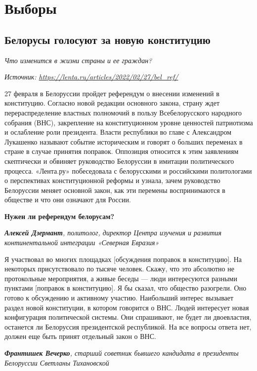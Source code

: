 \chapter{Выборы}

\section{Белорусы голосуют за новую конституцию}

\textit{Что изменится в жизни страны и ее граждан?}

\textit{Источник: \url{https://lenta.ru/articles/2022/02/27/bel_ref/}}

27 февраля в Белоруссии пройдет референдум о внесении изменений в конституцию. Согласно новой редакции основного закона, страну ждет перераспределение властных полномочий в пользу Всебелорусского народного собрания (ВНС), закрепление на конституционном уровне ценностей патриотизма и ослабление роли президента. Власти республики во главе с Александром Лукашенко называют событие историческим и говорят о больших переменах в стране в случае принятия поправок. Оппозиция относится к этим заявлениям скептически и обвиняет руководство Белоруссии в имитации политического процесса. «Лента.ру» побеседовала с белорусскими и российскими политологами о перспективах конституционной реформы и узнала, зачем руководство Белоруссии меняет основной закон, как эти перемены воспринимаются в обществе и что они означают для России.

\textbf{Нужен ли референдум белорусам?}

\textit{\textbf{Алексей Дзермант}, политолог, директор Центра изучения и развития континентальной интеграции «Северная Евразия»}

Я участвовал во многих площадках [обсуждения поправок в конституцию]. На некоторых присутствовало по тысяче человек. Скажу, что это абсолютно не протокольные мероприятия, а живые беседы — люди интересуются разными пунктами [поправок в конституцию]. Я бы сказал, что общество разогрели. Оно готово к обсуждению и активному участию. Наибольший интерес вызывает раздел новой конституции, в котором говорится о ВНС. Людей интересует новая конфигурация политической системы. Они спрашивают, не будет ли двоевластия, останется ли Белоруссия президентской республикой. На все вопросы ответа нет, должен еще быть принят отдельный закон о ВНС.

\textit{\textbf{Франтишек Вечерко}, старший советник бывшего кандидата в президенты Белоруссии Светланы Тихановской}

